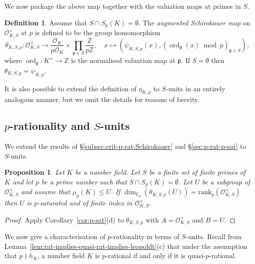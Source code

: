 \documentclass[12pt, a4paper, usenames]{amsart}
\def\ord{\mathop{\mathrm {ord}}\nolimits}
\newcommand{\Z}{\mathbb{Z}}
\theoremstyle{plain}
\newtheorem{prop}[theorem]{Proposition}
\theoremstyle{remark}
\theoremstyle{definition}
\newtheorem{definition}[theorem]{Definition}
\newcommand{\rank}{\mathrm{rank}}
\begin{document}
We now package the above map together with the valuation maps at primes in $S$.

\begin{definition}
Assume that $S \cap S_{p}(K) = \emptyset$.
The \textit{augmented Schirokauer map} on $\mathcal{O}_{K,S}^{\times}$ at $p$
is defined to be the group homomorphism
\[
\theta_{K,S,p} \colon \mathcal{O}_{K,S}^{\times} \longrightarrow 
\frac{\mathcal{O}_{K}}{p\mathcal{O}_{K}} \times \prod_{\mathfrak{p} \in S} \frac{\Z}{p\Z},
\quad x \mapsto \left( \psi_{K,S,p}(x), (\ord_{\mathfrak{p}}(x) \bmod{p})_{\mathfrak{p} \in S} \right),
\]
where $\ord_{\mathfrak{p}} \colon K^{\times} \rightarrow \Z$ is the normalised valuation map at $\mathfrak{p}$.
If $S=\emptyset$ then $\theta_{K,S,p}=\psi_{K,p}$.
\end{definition}

It is also possible to extend the definition of $\eta_{K,p}$ to $S$-units
in an entirely analogous manner, but we omit the details for reasons of brevity.

\subsection{$p$-rationality and $S$-units}
We extend the results of \S \ref{subsec:crit-p-rat-Schirokauer} and 
\S \ref{sec:p-rat-p-sat} to $S$-units.

\begin{prop}\label{prop:S-units-map-gives-p-sat} 
Let $K$ be a number field. 
Let $S$ be a finite set of finite primes of $K$ and 
let $p$ be a prime number such that $S \cap S_{p}(K)=\emptyset$.
Let $U$ be a subgroup of $\mathcal{O}_{K,S}^{\times}$
and assume that $\mu_{p}(K) \leq U$.
If $\dim_{\mathbb{F}_{p}}(\theta_{K,S,p}(U)) = \rank_{p}(\mathcal{O}_{K,S}^{\times})$
then $U$ is $p$-saturated and of finite index in $\mathcal{O}_{K,S}^{\times}$.
\end{prop}

\begin{proof}
Apply Corollary~\ref{cor:p-sat}(d) to $\theta_{K,S,p}$ 
with $A=\mathcal{O}_{K,S}^{\times}$ and $B=U$.    
\end{proof}

We now give a characterisation of $p$-rationality in terms of $S$-units.
Recall from Lemma~\ref{lem:rat-implies-quasi-rat-implies-leopoldt}(c) that under the assumption that $p \nmid h_{K}$, a number field $K$ is $p$-rational if and only 
if it is quasi-$p$-rational. 
\end{document}

